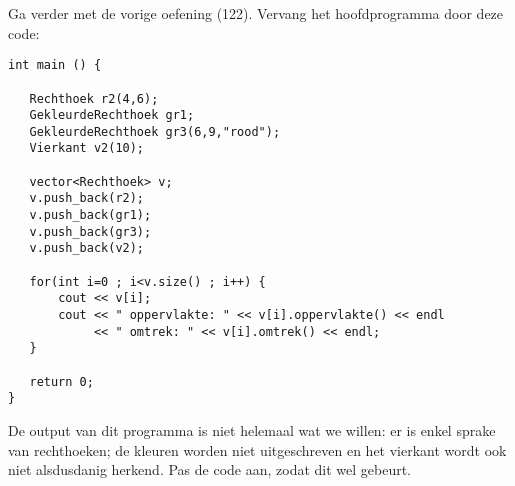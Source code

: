 \beginoef
Ga verder met de vorige oefening (122).  Vervang het hoofdprogramma door deze code:
\begin{footnotesize}
\begin{verbatim}
int main () {   

   Rechthoek r2(4,6); 
   GekleurdeRechthoek gr1; 
   GekleurdeRechthoek gr3(6,9,"rood"); 
   Vierkant v2(10);

   vector<Rechthoek> v; 
   v.push_back(r2); 
   v.push_back(gr1); 
   v.push_back(gr3); 
   v.push_back(v2);

   for(int i=0 ; i<v.size() ; i++) { 
       cout << v[i]; 
       cout << " oppervlakte: " << v[i].oppervlakte() << endl 
            << " omtrek: " << v[i].omtrek() << endl; 
   }
     
   return 0;
}          
\end{verbatim} 
\end{footnotesize}
De output van dit programma is niet helemaal wat we willen: er is enkel sprake van rechthoeken; de kleuren worden niet uitgeschreven en het vierkant wordt ook niet alsdusdanig herkend.
Pas de code aan, zodat dit wel gebeurt.


\endoef
